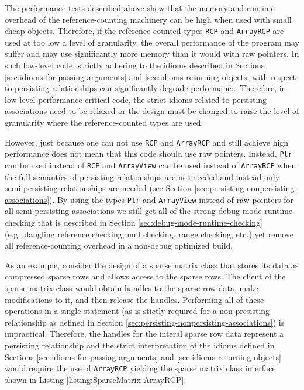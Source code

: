 \documentclass[pdf,ps2pdf,11pt]{SANDreport}
\begin{document}
The performance tests described above show that the memory and runtime
overhead of the reference-counting machinery can be high when used
with small cheap objects.  Therefore, if the reference counted types
{}\texttt{RCP} and {}\texttt{ArrayRCP} are used at too low a level of
granularity, the overall performance of the program may suffer and may
use significantly more memory than it would with raw pointers.  In
such low-level code, strictly adhering to the idioms described in
Sections {}\ref{sec:idioms-for-passing-arguments} and
{}\ref{sec:idioms-returning-objects} with respect to persisting
relationships can significantly degrade performance.  Therefore, in
low-level performance-critical code, the strict idioms related to
persisting associations need to be relaxed or the design must be
changed to raise the level of granularity where the reference-counted
types are used.

However, just because one can not use {}\texttt{RCP} and
{}\texttt{ArrayRCP} and still achieve high performance does not mean
that this code should use raw pointers.  Instead, {}\texttt{Ptr} can
be used instead of {}\texttt{RCP} and {}\texttt{ArrayView} can be used
instead of {}\texttt{ArrayRCP} when the full semantics of persisting
relationships are not needed and instead only semi-persisting
relationships are needed (see Section
{}\ref{sec:persisting-nonpersisting-associations}).  By using the
types {}\texttt{Ptr} and {}\texttt{ArrayView} instead of raw pointers
for all semi-persisting associations we still get all of the strong
debug-mode runtime checking that is described in Section
{}\ref{sec:debug-mode-runtime-checking} (e.g.\ dangling reference
checking, null checking, range checking, etc.) yet remove all
reference-counting overhead in a non-debug optimized build.

As an example, consider the design of a sparse matrix class that
stores its data as compressed sparse rows and allows access to the
sparse rows.  The client of the sparse matrix class would obtain
handles to the sparse row data, make modifications to it, and then
release the handles.  Performing all of these operations in a single
statement (as is stictly required for a non-presisting relationship as
defined in Section {}\ref{sec:persisting-nonpersisting-associations})
is impractical.  Therefore, the handles for the interal sparse row
data represent a persisting relationship and the strict interpretation
of the idioms defined in Sections
{}\ref{sec:idioms-for-passing-arguments} and
{}\ref{sec:idioms-returning-objects} would require the use of
{}\texttt{ArrayRCP} yielding the sparse matrix class interface shown
in Listing {}\ref{listing:SparseMatrix-ArrayRCP}.
\end{document}
